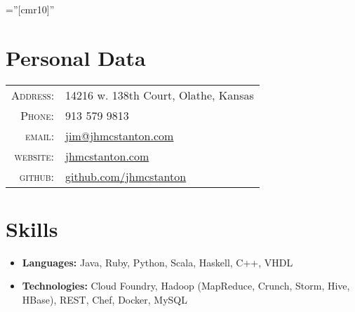 \documentclass[10pt]{article} %
\begin{document}
\pagestyle{empty} %

\font\fb=''[cmr10]'' %


\par{\bigskip\par} %

\section{Personal Data}

\begin{table}[h]
\centering
\begin{tabular}{rl}
\textsc{Address:} & 14216 w. 138th Court, Olathe, Kansas \\
\textsc{Phone:} & 913 579 9813 \\
\textsc{email:} & \href{mailto:jim@jhmcstanton.com}{jim@jhmcstanton.com}\\
\textsc{website:} & \href{http://www.jhmcstanton.com}{jhmcstanton.com}\\
\textsc{github:} & \href{http://www.github.com/jhmcstanton}{github.com/jhmcstanton}
\end{tabular}
\end{table}


\section{Skills}

\begin{itemize}
\item \textbf{Languages:} Java, Ruby, Python, Scala, Haskell, C++, VHDL
\item \textbf{Technologies:} Cloud Foundry, Hadoop (MapReduce, Crunch, Storm, Hive, HBase), REST, Chef, Docker, MySQL
\end{itemize}
\end{document}
